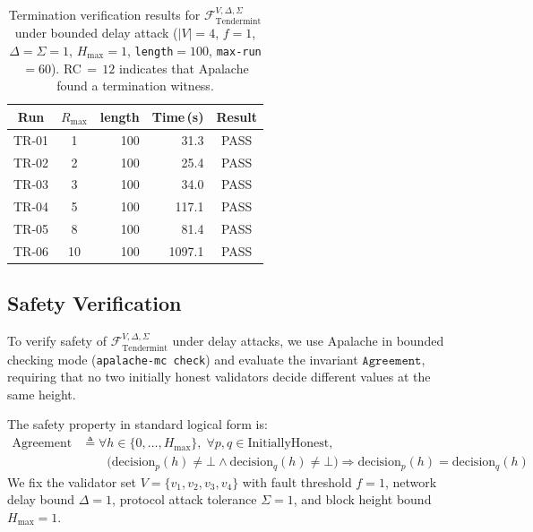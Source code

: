 \begin{table}[ht]
\centering
\caption{%
  Termination verification results for
  $\mathcal{F}^{V,\Delta,\Sigma}_{\mathrm{Tendermint}}$
  under bounded delay attack
  ($|V|=4$, $f=1$, $\Delta=\Sigma=1$, $H_{\max}=1$,
  \texttt{length}$=100$, \texttt{max-run}$=60$).
  RC$\,=\,12$ indicates that Apalache found a termination witness.
}
\label{tab:termination}
\small
\begin{tabular}{@{}ccrrc@{}}
\toprule
\textbf{Run} &
$R_{\max}$ &
\textbf{length} &
\textbf{Time\,(s)} &
\textbf{Result} \\
\midrule
TR-01 &  1 & 100 &    31.3 & PASS \\
TR-02 &  2 & 100 &    25.4 & PASS \\
TR-03 &  3 & 100 &    34.0 & PASS \\
TR-04 &  5 & 100 &   117.1 & PASS \\
TR-05 &  8 & 100 &    81.4 & PASS \\
TR-06 & 10 & 100 &  1097.1 & PASS \\
\bottomrule
\end{tabular}
\end{table}

\subsection{Safety Verification}

To verify safety of $\mathcal{F}^{V,\Delta,\Sigma}_{\mathrm{Tendermint}}$
under delay attacks, we use Apalache in bounded checking mode
(\texttt{apalache-mc check}) and evaluate the invariant
$\texttt{Agreement}$, requiring that no two initially honest validators
decide different values at the same height.

The safety property in standard logical form is:
\begin{align*}
\mathrm{Agreement}
&\triangleq
\forall h\in\{0,\dots,H_{\max}\},\; \forall p,q\in\mathrm{InitiallyHonest},
\\
&\qquad\Big(\mathrm{decision}_p(h)\neq\bot \wedge \mathrm{decision}_q(h)\neq\bot\Big)
\Rightarrow
\mathrm{decision}_p(h)=\mathrm{decision}_q(h)
\end{align*}
We fix the validator set $V=\{v_1,v_2,v_3,v_4\}$ with fault threshold $f=1$,
network delay bound $\Delta=1$, protocol attack tolerance $\Sigma=1$,
and block height bound $H_{\max}=1$.

